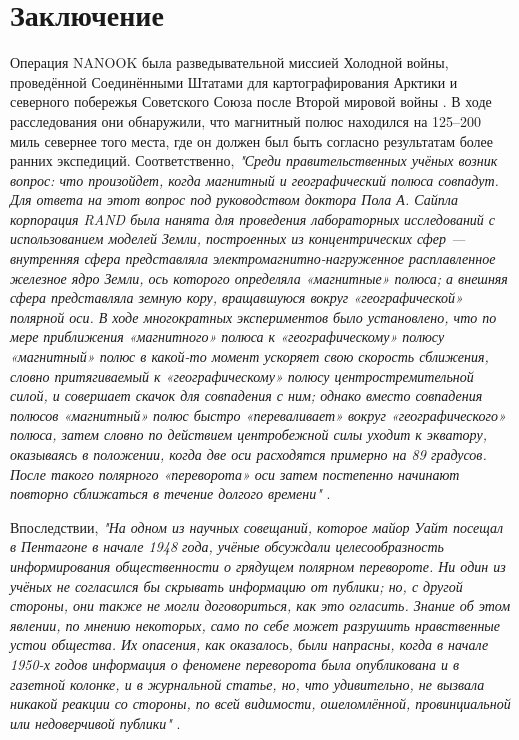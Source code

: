 \documentclass[10pt,twocolumn,letterpaper]{article}
\begin{document}
\section{Заключение}

Операция NANOOK была разведывательной миссией Холодной войны, проведённой Соединёнными Штатами для картографирования Арктики и северного побережья Советского Союза после Второй мировой войны \cite{137}. В ходе расследования они обнаружили, что магнитный полюс находился на 125–200 миль севернее того места, где он должен был быть согласно результатам более ранних экспедиций. Соответственно, \textit{"Среди правительственных учёных возник вопрос: что произойдет, когда магнитный и географический полюса совпадут. Для ответа на этот вопрос под руководством доктора Пола А. Сайпла корпорация RAND была нанята для проведения лабораторных исследований с использованием моделей Земли, построенных из концентрических сфер — внутренняя сфера представляла электромагнитно-нагруженное расплавленное железное ядро Земли, ось которого определяла «магнитные» полюса; а внешняя сфера представляла земную кору, вращавшуюся вокруг «географической» полярной оси. В ходе многократных экспериментов было установлено, что по мере приближения «магнитного» полюса к «географическому» полюсу «магнитный» полюс в какой-то момент ускоряет свою скорость сближения, словно притягиваемый к «географическому» полюсу центростремительной силой, и совершает скачок для совпадения с ним; однако вместо совпадения полюсов «магнитный» полюс быстро «переваливает» вокруг «географического» полюса, затем словно по действием центробежной силы уходит к экватору, оказываясь в положении, когда две оси расходятся примерно на 89 градусов. После такого полярного «переворота» оси затем постепенно начинают повторно сближаться в течение долгого времени"} \cite{138,139}.

Впоследствии, \textit{"На одном из научных совещаний, которое майор Уайт посещал в Пентагоне в начале 1948 года, учёные обсуждали целесообразность информирования общественности о грядущем полярном перевороте. Ни один из учёных не согласился бы скрывать информацию от публики; но, с другой стороны, они также не могли договориться, как это огласить. Знание об этом явлении, по мнению некоторых, само по себе может разрушить нравственные устои общества. Их опасения, как оказалось, были напрасны, когда в начале 1950-х годов информация о феномене переворота была опубликована и в газетной колонке, и в журнальной статье, но, что удивительно, не вызвала никакой реакции со стороны, по всей видимости, ошеломлённой, провинциальной или недоверчивой публики"} \cite{138,139}.
\end{document}

